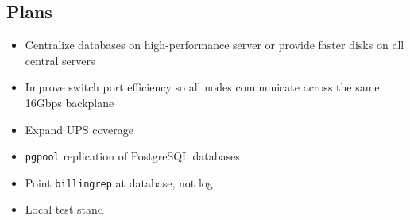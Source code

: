 \documentclass{beamer}
\begin{document}
\subsection{Plans}
\begin{frame}
\begin{itemize}
	\item Centralize databases on high-performance server or provide faster disks on all central servers
	\item Improve switch port efficiency so all nodes communicate across the same 16Gbps backplane
	\item Expand UPS coverage
	\item {\tt pgpool} replication of PostgreSQL databases
	\item Point {\tt billingrep} at database, not log
	\item Local test stand
\end{itemize}
\end{frame}
\end{document}
